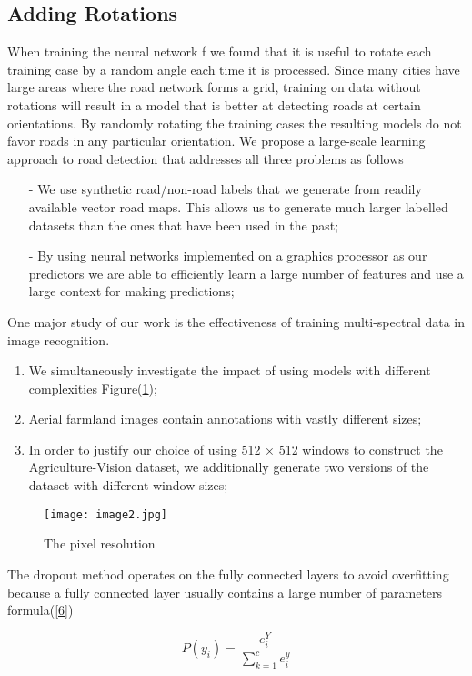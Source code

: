 \documentclass[acmlarge]{acmart}
\begin{document}
 \subsection{Adding Rotations}
\raggedright When training the neural network f we found that it is useful to rotate each training case by a random angle each time it is processed. Since many cities have large areas where the road network forms a grid, training on data without rotations will result in a model that is better at detecting roads at certain orientations. By randomly rotating the training cases the resulting models do not favor roads in any particular orientation.
\newline
We propose a large-scale learning approach to road detection that addresses all three problems as follows
 \begin{itemize}
    \item[-] We use synthetic road/non-road labels that we generate from readily available vector road maps. This allows us to generate much larger labelled datasets than the ones that have been used in the past;
    \item[-]By using neural networks implemented on a graphics processor as our predictors we are able to efficiently learn a large number of features and use a large context for making predictions;
\end{itemize}

One major study of our work is the effectiveness of training multi-spectral data in image recognition.
\begin{enumerate}
\item We simultaneously investigate the impact of using models with different complexities Figure(\ref{5});
\item Aerial farmland images contain annotations with vastly different sizes;
\item In order to justify our choice of using 512 × 512 windows to construct the Agriculture-Vision dataset, we additionally generate two versions of the dataset with different window sizes;
\end{enumerate}

\begin{figure}
        \centering
        \texttt{[image: image2.jpg]}
        \caption{The pixel resolution}
        \label{5}
    \end{figure}

\raggedright The dropout method operates on the fully connected layers to avoid overfitting because a fully connected layer usually contains a large number of parameters formula(\ref{6})

\begin{equation}
\label{6}
P(y_i)=\frac{e^Y_i}{ \sum\limits^c_{k=1} e^y_i}
\end{equation}
\end{document}

